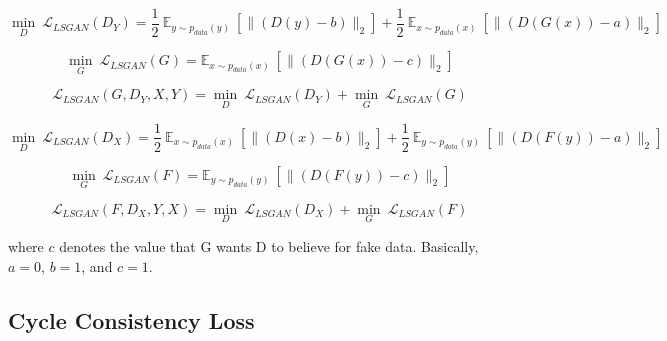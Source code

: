     \begin{equation}\label{lsgan1}
        \underset{D}{\min}\ \mathcal{L}_{LSGAN}(D_Y) = \frac{1}{2}\ \mathbb{E}_{y \sim p_{data}(y)}\ [\|(D(y) - b)\|_2] + 
        \frac{1}{2}\ \mathbb{E}_{x \sim p_{data}(x)}\ [\|(D(G(x)) - a)\|_2]
    \end{equation}
    
    \begin{equation}\label{lsgan2}
        \underset{G}{\min}\ \mathcal{L}_{LSGAN}(G) = \mathbb{E}_{x \sim p_{data}(x)}\ [\|(D(G(x)) - c)\|_2]
    \end{equation}
    
    \begin{equation}\label{lsgan3}
    \mathcal{L}_{LSGAN}(G, D_Y, X, Y) =  \underset{D}{\min}\ \mathcal{L}_{LSGAN}(D_Y) + \underset{G}{\min}\ \mathcal{L}_{LSGAN}(G)
    \end{equation}
    
    \begin{equation}\label{lsgan4}
        \underset{D}{\min}\ \mathcal{L}_{LSGAN}(D_X) = \frac{1}{2}\ \mathbb{E}_{x \sim p_{data}(x)}\ [\|(D(x) - b)\|_2] + 
        \frac{1}{2}\ \mathbb{E}_{y \sim p_{data}(y)}\ [\|(D(F(y)) - a)\|_2]
    \end{equation}
    
    \begin{equation}\label{lsgan5}        
        \underset{G}{\min}\ \mathcal{L}_{LSGAN}(F) = \mathbb{E}_{y \sim p_{data}(y)}\ [\|(D(F(y)) - c)\|_2]
    \end{equation}
    
    
    \begin{equation}\label{lsgan6}        
        \mathcal{L}_{LSGAN}(F, D_X, Y, X) = \underset{D}{\min}\ \mathcal{L}_{LSGAN}(D_X) + \underset{G}{\min}\ \mathcal{L}_{LSGAN}(F)
    \end{equation}
    
    where $c$ denotes the value that G wants D to believe for fake data. Basically, $a = 0$, $b = 1$, and $c = 1$.





\subsection{Cycle Consistency Loss}\label{CycleConsistencyLoss}

